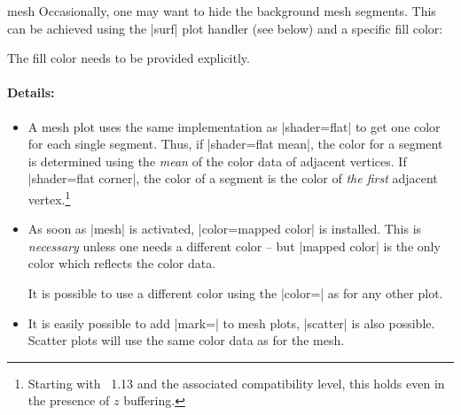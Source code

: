 {\begin{plottype}[/pgfplots]{mesh}
	Occasionally, one may want to hide the background mesh segments. This can be achieved using the |surf| plot handler (see below) and a specific fill color:
\pgfplotsexpensiveexample
\begin{codeexample}[]
\end{codeexample}
	The fill color needs to be provided explicitly.

	\paragraph{Details:}
	\begin{itemize}
		\item 
	A mesh plot uses the same implementation as |shader=flat| to get one color for each single segment. Thus, if |shader=flat mean|, the color for a segment is determined using the \emph{mean} of the color data of adjacent vertices. If |shader=flat corner|, the color of a segment is the color of \emph{the first} adjacent vertex.\footnote{Starting with \PGFPlots\ 1.13 and the associated compatibility level, this holds even in the presence of $z$ buffering.}
		\item As soon as |mesh| is activated, |color=mapped color| is installed. This is \emph{necessary} unless one needs a different color -- but |mapped color| is the only color which reflects the color data.

		It is possible to use a different color using the |color=| as for any other plot.

		\item It is easily possible to add |mark=| to mesh plots, |scatter| is also possible. Scatter plots will use the same color data as for the mesh.
	\end{itemize}

\pgfplotsexpensiveexample
\begin{codeexample}[]
\end{codeexample}
	

\end{plottype}}
